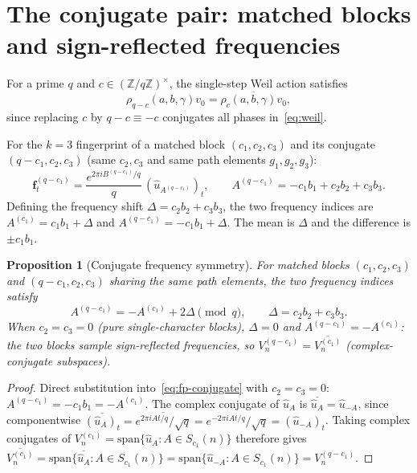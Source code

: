 \documentclass[11pt]{article}
\newtheorem{proposition}[theorem]{Proposition}
\newcommand{\fp}{\mathbf{f}}
\newcommand{\ue}{\hat{u}}
\begin{document}
  \section{The conjugate pair: matched blocks and sign-reflected frequencies}
    \label{sec:conjugate}

    For a prime $q$ and $c\in(\mathbb{Z}/q\mathbb{Z})^\times$, the single-step Weil action
    satisfies
    \begin{equation}
      \label{eq:conjugation}
      \rho_{q-c}(a,b,\gamma)v_0 = \overline{\rho_c(a,b,\gamma)v_0},
    \end{equation}
    since replacing $c$ by $q-c\equiv-c$ conjugates all phases in~\eqref{eq:weil}.

    For the $k{=}3$ fingerprint of a matched block $(c_1,c_2,c_3)$ and its conjugate
    $(q-c_1,c_2,c_3)$ (same $c_2,c_3$ and same path elements $g_1,g_2,g_3$):
    \begin{equation}
      \label{eq:fp-conjugate}
      \fp^{(q-c_1)}_t
      = \frac{e^{2\pi iB^{(q-c_1)}/q}}{q}\,(\ue_{A^{(q-c_1)}})_t,
      \qquad
      A^{(q-c_1)} = -c_1b_1 + c_2b_2 + c_3b_3.
    \end{equation}
    Defining the frequency shift $\Delta = c_2b_2+c_3b_3$, the two frequency indices are
    $A^{(c_1)} = c_1b_1+\Delta$ and $A^{(q-c_1)} = -c_1b_1+\Delta$.
    The mean is $\Delta$ and the difference is $\pm c_1 b_1$.

    \begin{proposition}[Conjugate frequency symmetry]
      \label{prop:conjugate}
      For matched blocks $(c_1,c_2,c_3)$ and $(q-c_1,c_2,c_3)$ sharing the same path
      elements, the two frequency indices satisfy
      \[
        A^{(q-c_1)} = -A^{(c_1)} + 2\Delta \pmod{q},
        \qquad
        \Delta = c_2b_2+c_3b_3.
      \]
      When $c_2=c_3=0$ (pure single-character blocks), $\Delta=0$ and
      $A^{(q-c_1)} = -A^{(c_1)}$: the two blocks sample sign-reflected frequencies,
      so $V^{(q-c_1)}_n = \overline{V^{(c_1)}_n}$ (complex-conjugate subspaces).
    \end{proposition}

    \begin{proof}
      Direct substitution into~\eqref{eq:fp-conjugate} with $c_2=c_3=0$:
      $A^{(q-c_1)} = -c_1b_1 = -A^{(c_1)}$.
      The complex conjugate of $\ue_A$ is $\overline{\ue_A} = \ue_{-A}$, since
      componentwise $\overline{(\ue_A)_t} = \overline{e^{2\pi iAt/q}/\sqrt{q}}
      = e^{-2\pi iAt/q}/\sqrt{q} = (\ue_{-A})_t$.
      Taking complex conjugates of $V^{(c_1)}_n = \mathrm{span}\{\ue_A : A\in S_{c_1}(n)\}$
      therefore gives
      $\overline{V^{(c_1)}_n}
      = \mathrm{span}\{\overline{\ue_A} : A\in S_{c_1}(n)\}
      = \mathrm{span}\{\ue_{-A} : A\in S_{c_1}(n)\}
      = V^{(q-c_1)}_n$.
    \end{proof}
\end{document}
